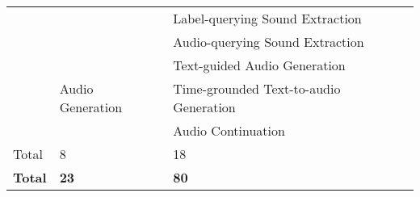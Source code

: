 \begin{longtable}{p{1.5cm}p{6cm}p{7cm}}
                         &                   & Label-querying Sound Extraction \\
                         &                   & Audio-querying Sound Extraction \\                        
                         \cline{2-3} %
                         & \multirow{3}{*}{Audio Generation} & Text-guided Audio Generation  \\
                         &                   & Time-grounded Text-to-audio Generation        \\
                         &                   & Audio Continuation  \\
                         \cline{2-3} %
     
     \cline{2-3}
    Total & 8 & 18  \\  %
    \midrule
    \midrule
     \textbf{Total}& \textbf{23} & \textbf{80}  \\
    \bottomrule
\end{longtable}

